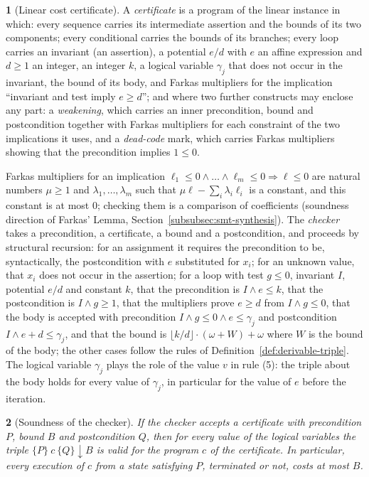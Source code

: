 \documentclass[oneside,english]{amsart}
\numberwithin{equation}{section}
\numberwithin{figure}{section}
\theoremstyle{plain}
\newtheorem{thm}{\protect\theoremname}
\theoremstyle{definition}
\newtheorem{defn}[thm]{\protect\definitionname}
\theoremstyle{plain}
\theoremstyle{remark}
\theoremstyle{plain}
\theoremstyle{definition}
\theoremstyle{plain}
\theoremstyle{remark}
\providecommand{\definitionname}{Definition}
\providecommand{\theoremname}{Theorem}
\begin{document}
\begin{defn}[Linear cost certificate]
\label{def:certificate}
A \emph{certificate} is a program of the linear instance in which: every sequence carries its intermediate assertion and the bounds of its two components; every conditional carries the bounds of its branches; every loop carries an invariant (an assertion), a potential $e/d$ with $e$ an affine expression and $d \ge 1$ an integer, an integer $k$, a logical variable $\gamma_j$ that does not occur in the invariant, the bound of its body, and Farkas multipliers for the implication ``invariant and test imply $e \ge d$''; and where two further constructs may enclose any part: a \emph{weakening}, which carries an inner precondition, bound and postcondition together with Farkas multipliers for each constraint of the two implications it uses, and a \emph{dead-code} mark, which carries Farkas multipliers showing that the precondition implies $1 \le 0$.
\end{defn}

Farkas multipliers for an implication $\ell_1 \le 0 \wedge \dots \wedge \ell_m \le 0 \Rightarrow \ell \le 0$ are natural numbers $\mu \ge 1$ and $\lambda_1, \dots, \lambda_m$ such that $\mu \ell - \sum_i \lambda_i \ell_i$ is a constant, and this constant is at most $0$; checking them is a comparison of coefficients (soundness direction of Farkas' Lemma, Section~\ref{subsubsec:smt-synthesis}). The \emph{checker} takes a precondition, a certificate, a bound and a postcondition, and proceeds by structural recursion: for an assignment it requires the precondition to be, syntactically, the postcondition with $e$ substituted for $x_i$; for an unknown value, that $x_i$ does not occur in the assertion; for a loop with test $g \le 0$, invariant $I$, potential $e/d$ and constant $k$, that the precondition is $I \wedge e \le k$, that the postcondition is $I \wedge g \ge 1$, that the multipliers prove $e \ge d$ from $I \wedge g \le 0$, that the body is accepted with precondition $I \wedge g \le 0 \wedge e \le \gamma_j$ and postcondition $I \wedge e + d \le \gamma_j$, and that the bound is $\lfloor k/d \rfloor \cdot (\omega + W) + \omega$ where $W$ is the bound of the body; the other cases follow the rules of Definition~\ref{def:derivable-triple}. The logical variable $\gamma_j$ plays the role of the value $v$ in rule (5): the triple about the body holds for every value of $\gamma_j$, in particular for the value of $e$ before the iteration.

\begin{thm}[Soundness of the checker]
\label{thm:checker-soundness}
If the checker accepts a certificate with precondition $P$, bound $B$ and postcondition $Q$, then for every value of the logical variables the triple $\{P\}\ c\ \{Q\}\!\downarrow\! B$ is valid for the program $c$ of the certificate. In particular, every execution of $c$ from a state satisfying $P$, terminated or not, costs at most $B$.
\end{thm}
\end{document}
